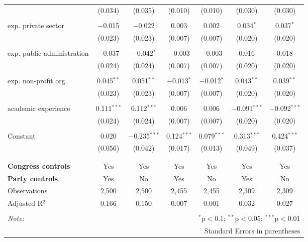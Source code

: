 \documentclass{article}
\begin{document}
\begin{table}[!htbp]
\begin{tabular}{@{\extracolsep{5pt}}lcccccc}
  & (0.034) & (0.035) & (0.010) & (0.010) & (0.030) & (0.030) \\ 
  & & & & & & \\ 
 exp. private sector & $-$0.015 & $-$0.022 & 0.003 & 0.002 & 0.034$^{*}$ & 0.037$^{*}$ \\ 
  & (0.023) & (0.023) & (0.007) & (0.007) & (0.020) & (0.020) \\ 
  & & & & & & \\ 
 exp. public administration & $-$0.037 & $-$0.042$^{*}$ & $-$0.003 & $-$0.003 & 0.016 & 0.018 \\ 
  & (0.024) & (0.024) & (0.007) & (0.007) & (0.020) & (0.020) \\ 
  & & & & & & \\ 
 exp. non-profit org. & 0.045$^{**}$ & 0.051$^{**}$ & $-$0.013$^{*}$ & $-$0.012$^{*}$ & 0.043$^{**}$ & 0.039$^{**}$ \\ 
  & (0.023) & (0.023) & (0.007) & (0.007) & (0.020) & (0.020) \\ 
  & & & & & & \\ 
 academic experience & 0.111$^{***}$ & 0.112$^{***}$ & 0.006 & 0.006 & $-$0.091$^{***}$ & $-$0.092$^{***}$ \\ 
  & (0.024) & (0.024) & (0.007) & (0.007) & (0.020) & (0.020) \\ 
  & & & & & & \\ 
 Constant & 0.020 & $-$0.235$^{***}$ & 0.124$^{***}$ & 0.079$^{***}$ & 0.313$^{***}$ & 0.424$^{***}$ \\ 
  & (0.056) & (0.042) & (0.017) & (0.013) & (0.049) & (0.037) \\ 
  & & & & & & \\ 
\hline \\[-1.8ex] 
\textbf{Congress controls} & Yes & Yes & Yes & Yes & Yes & Yes \\ 
\textbf{Party controls} & Yes & No & Yes & No & Yes & No \\ 
Observations & 2,500 & 2,500 & 2,455 & 2,455 & 2,309 & 2,309 \\ 
Adjusted R$^{2}$ & 0.166 & 0.150 & 0.007 & 0.001 & 0.032 & 0.027 \\ 
\hline 
\hline \\[-1.8ex] 
\textit{Note:}  & \multicolumn{6}{r}{$^{*}$p$<$0.1; $^{**}$p$<$0.05; $^{***}$p$<$0.01} \\ 
 & \multicolumn{6}{r}{Standard Errors in parentheses} \\ 
\end{tabular} 
\end{table} 
\end{document}
